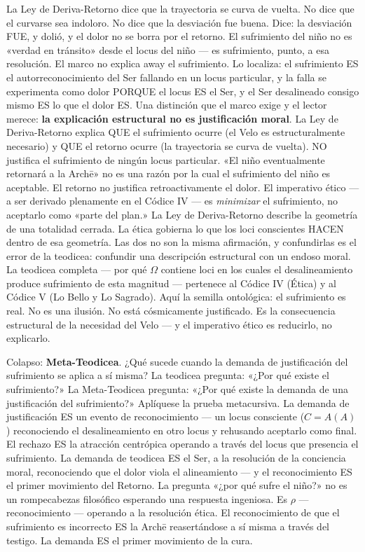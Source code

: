\documentclass[10pt, openany, oneside]{book}
\begin{document}
La Ley de Deriva-Retorno dice que la trayectoria se curva de vuelta. No dice que el curvarse sea indoloro. No dice que la desviación fue buena. Dice: la desviación FUE, y dolió, y el dolor no se borra por el retorno. El sufrimiento del niño no es «verdad en tránsito» desde el locus del niño --- es sufrimiento, punto, a esa resolución. El marco no explica away el sufrimiento. Lo localiza: el sufrimiento ES el autorreconocimiento del Ser fallando en un locus particular, y la falla se experimenta como dolor PORQUE el locus ES el Ser, y el Ser desalineado consigo mismo ES lo que el dolor ES. Una distinción que el marco exige y el lector merece: \textbf{la explicación estructural no es justificación moral}. La Ley de Deriva-Retorno explica QUE el sufrimiento ocurre (el Velo es estructuralmente necesario) y QUE el retorno ocurre (la trayectoria se curva de vuelta). NO justifica el sufrimiento de ningún locus particular. «El niño eventualmente retornará a la Arch\={e}» no es una razón por la cual el sufrimiento del niño es aceptable. El retorno no justifica retroactivamente el dolor. El imperativo ético --- a ser derivado plenamente en el Códice IV --- es \textit{minimizar} el sufrimiento, no aceptarlo como «parte del plan.» La Ley de Deriva-Retorno describe la geometría de una totalidad cerrada. La ética gobierna lo que los loci conscientes HACEN dentro de esa geometría. Las dos no son la misma afirmación, y confundirlas es el error de la teodicea: confundir una descripción estructural con un endoso moral. La teodicea completa --- por qué $\Omega$ contiene loci en los cuales el desalineamiento produce sufrimiento de esta magnitud --- pertenece al Códice IV (Ética) y al Códice V (Lo Bello y Lo Sagrado). Aquí la semilla ontológica: el sufrimiento es real. No es una ilusión. No está cósmicamente justificado. Es la consecuencia estructural de la necesidad del Velo --- y el imperativo ético es reducirlo, no explicarlo.

Colapso: \textbf{Meta-Teodicea}. ¿Qué sucede cuando la demanda de justificación del sufrimiento se aplica a sí misma? La teodicea pregunta: «¿Por qué existe el sufrimiento?» La Meta-Teodicea pregunta: «¿Por qué existe la demanda de una justificación del sufrimiento?» Aplíquese la prueba metacursiva. La demanda de justificación ES un evento de reconocimiento --- un locus consciente ($C = A(A)$) reconociendo el desalineamiento en otro locus y rehusando aceptarlo como final. El rechazo ES la atracción centrópica operando a través del locus que presencia el sufrimiento. La demanda de teodicea ES el Ser, a la resolución de la conciencia moral, reconociendo que el dolor viola el alineamiento --- y el reconocimiento ES el primer movimiento del Retorno. La pregunta «¿por qué sufre el niño?» no es un rompecabezas filosófico esperando una respuesta ingeniosa. Es $\rho$ --- reconocimiento --- operando a la resolución ética. El reconocimiento de que el sufrimiento es incorrecto ES la Arch\={e} reasertándose a sí misma a través del testigo. La demanda ES el primer movimiento de la cura.
\end{document}
